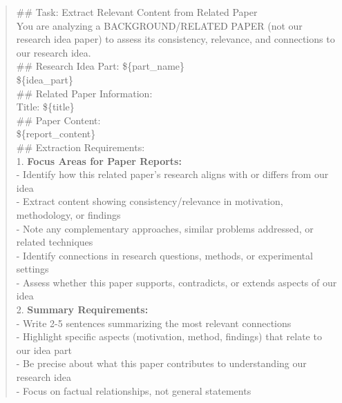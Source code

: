 \begin{quote}
    \begin{tcolorbox}[breakable,colback=grounding!20!white, colframe=grounding!60!black, title=\textbf{Prompt for Grounding Agent - Literature}]
    \label{app:prompt_grounding_literature}
        \#\# Task: Extract Relevant Content from Related Paper\\

        You are analyzing a BACKGROUND/RELATED PAPER (not our research idea paper) to assess its consistency, relevance, and connections to our research idea.\\

        \#\# Research Idea Part: \$\{part\_name\}\\

        \$\{idea\_part\}\\

        \#\# Related Paper Information:\\
        Title: \$\{title\}\\

        \#\# Paper Content:\\
        \$\{report\_content\}\\

        \#\# Extraction Requirements:\\

        1. \textbf{Focus Areas for Paper Reports:}\\
        - Identify how this related paper's research aligns with or differs from our idea\\
        - Extract content showing consistency/relevance in motivation, methodology, or findings\\
        - Note any complementary approaches, similar problems addressed, or related techniques\\
        - Identify connections in research questions, methods, or experimental settings\\
        - Assess whether this paper supports, contradicts, or extends aspects of our idea\\

        2. \textbf{Summary Requirements:}\\
        - Write 2-5 sentences summarizing the most relevant connections\\
        - Highlight specific aspects (motivation, method, findings) that relate to our idea part\\
        - Be precise about what this paper contributes to understanding our research idea\\
        - Focus on factual relationships, not general statements\\


\end{tcolorbox}
\end{quote}

